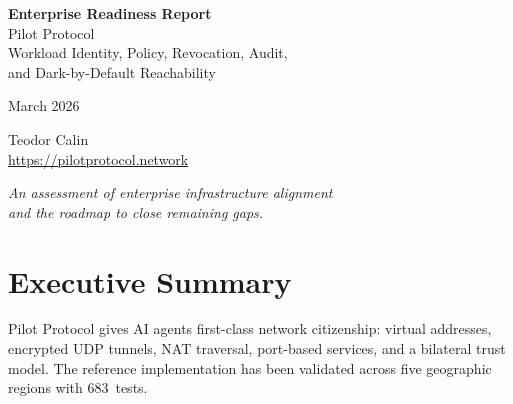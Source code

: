 \documentclass[11pt,a4paper]{article}
\begin{document}
\begin{titlepage}
\centering
\vspace*{3cm}

{\Huge\bfseries Enterprise Readiness Report\\[0.3em]}
{\LARGE Pilot Protocol\\[0.5em]}
{\large Workload Identity, Policy, Revocation, Audit,\\and Dark-by-Default Reachability\\[2em]}

{\large March 2026\\[3em]}

{\Large Teodor Calin\\[0.5em]}
{\small \url{https://pilotprotocol.network}\\[1em]}

\vfill

{\large\textit{An assessment of enterprise infrastructure alignment\\and the roadmap to close remaining gaps.}}

\vspace{2cm}
\end{titlepage}

\begin{abstract}
``Solves connectivity'' is only part of the enterprise problem. The harder bar is whether the connectivity layer also aligns with workload identity, policy, revocation, audit, and dark-by-default reachability---instead of just making peer connectivity easier. This report audits Pilot Protocol's current capabilities against these six enterprise dimensions, identifies the gaps, maps to emerging industry standards (SPIFFE/SPIRE, ONUG AOMC, CSA ATF/AICM), and presents a five-phase implementation roadmap. The goal: Pilot Protocol should interoperate with existing identity models rather than becoming a parallel trust island.
\end{abstract}

\tableofcontents
\newpage

\section{Executive Summary}

Pilot Protocol gives AI agents first-class network citizenship: virtual addresses, encrypted UDP tunnels, NAT traversal, port-based services, and a bilateral trust model. The reference implementation has been validated across five geographic regions with 683~tests.
\end{document}
